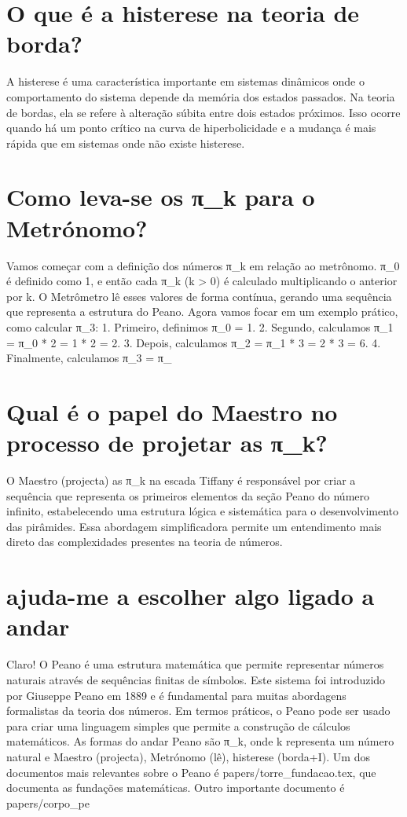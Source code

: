 \documentclass[11pt,a4paper]{article}
\begin{document}
\section{O que é a histerese na teoria de borda?}
A histerese é uma característica importante em sistemas dinâmicos onde o comportamento do sistema depende da memória dos estados passados. Na teoria de bordas, ela se refere à alteração súbita entre dois estados próximos. Isso ocorre quando há um ponto crítico na curva de hiperbolicidade e a mudança é mais rápida que em sistemas onde não existe histerese.

\section{Como leva-se os π\_k para o Metrónomo?}
Vamos começar com a definição dos números π\_k em relação ao metrônomo. π\_0 é definido como 1, e então cada π\_k (k > 0) é calculado multiplicando o anterior por k. O Metrômetro lê esses valores de forma contínua, gerando uma sequência que representa a estrutura do Peano. Agora vamos focar em um exemplo prático, como calcular π\_3: 1. Primeiro, definimos π\_0 = 1. 2. Segundo, calculamos π\_1 = π\_0 * 2 = 1 * 2 = 2. 3. Depois, calculamos π\_2 = π\_1 * 3 = 2 * 3 = 6. 4. Finalmente, calculamos π\_3 = π\_

\section{Qual é o papel do Maestro no processo de projetar as π\_k?}
O Maestro (projecta) as π\_k na escada Tiffany é responsável por criar a sequência que representa os primeiros elementos da seção Peano do número infinito, estabelecendo uma estrutura lógica e sistemática para o desenvolvimento das pirâmides. Essa abordagem simplificadora permite um entendimento mais direto das complexidades presentes na teoria de números.

\section{ajuda-me a escolher algo ligado a andar}
Claro! O Peano é uma estrutura matemática que permite representar números naturais através de sequências finitas de símbolos. Este sistema foi introduzido por Giuseppe Peano em 1889 e é fundamental para muitas abordagens formalistas da teoria dos números. Em termos práticos, o Peano pode ser usado para criar uma linguagem simples que permite a construção de cálculos matemáticos. As formas do andar Peano são π\_k, onde k representa um número natural e Maestro (projecta), Metrónomo (lê), histerese (borda+I). Um dos documentos mais relevantes sobre o Peano é papers/torre\_fundacao.tex, que documenta as fundações matemáticas. Outro importante documento é papers/corpo\_pe
\end{document}
